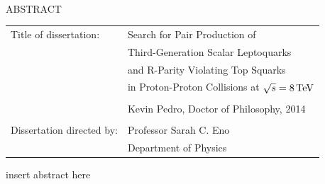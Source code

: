 \documentclass[12pt]{thesis}  %
\renewcommand{\baselinestretch}{2}
\begin{document}

\hbox{\ }

\renewcommand{\baselinestretch}{1}
\small \normalsize

\begin{center}
\large{{ABSTRACT}} 

\vspace{3em} 

\end{center}

\begin{singlespace}

\noindent
\begin{tabular}{@{}ll}
Title of dissertation:    & {\large  Search for Pair Production of}\\
                          & {\large  Third-Generation Scalar Leptoquarks} \\
                          & {\large  and R-Parity Violating Top Squarks} \\
                          & {\large  in Proton-Proton Collisions at $\sqrt{s} = 8\,\text{Te\hspace{-.08em}V}$} \\
                          & \\
                          & {\large  Kevin Pedro, Doctor of Philosophy, 2014} \\
                          & \\
Dissertation directed by: & {\large  Professor Sarah C. Eno} \\
                          & {\large  Department of Physics } \\
\end{tabular}

\end{singlespace}

\vspace{3em}

\renewcommand{\baselinestretch}{2}
\large \normalsize

insert abstract here


\end{document}
